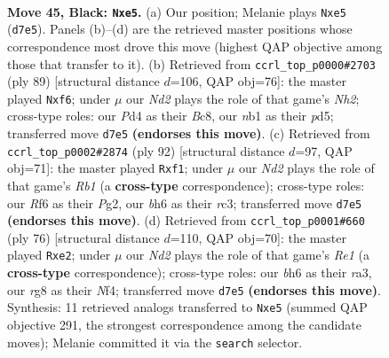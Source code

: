 \documentclass[11pt]{article}
\begin{document}
\clearpage

\begin{figure}[p]\centering
\begin{subfigure}{0.46\textwidth}\centering
\resizebox{\linewidth}{!}{%
\newchessgame
\chessboard[
  setfen={2b3R1/p2nk2p/1P3r1B/4QP2/1p1p4/8/p3P3/1N1K4 b - - 0 45},
  showmover=false,
  pgfstyle=straightmove, color=movearrow, markmove={d7-e5}
]}
\caption{}
\end{subfigure}\hfill
\begin{subfigure}{0.46\textwidth}\centering
\resizebox{\linewidth}{!}{%
\newchessgame
\chessboard[
  setfen={2b2r1k/7n/3p1Q2/3Pn3/p1PN3P/Pp6/1P4R1/4R2K b - - 0 45},
  showmover=false,
  pgfstyle=straightmove, color=movearrow, markmove={h7-f6}
]}
\caption{}
\end{subfigure}
\\[4pt]
\begin{subfigure}{0.46\textwidth}\centering
\resizebox{\linewidth}{!}{%
\newchessgame
\chessboard[
  setfen={8/8/5pk1/3P2Pp/p2NP1b1/P1r5/6P1/1R3q1K w - - 0 47},
  showmover=false,
  pgfstyle=straightmove, color=movearrow, markmove={b1-f1}
]}
\caption{}
\end{subfigure}\hfill
\begin{subfigure}{0.46\textwidth}\centering
\resizebox{\linewidth}{!}{%
\newchessgame
\chessboard[
  setfen={2r3k1/5p1p/3p2p1/1p2b3/4PN1P/rP4B1/4q1K1/3RR3 w - - 0 39},
  showmover=false,
  pgfstyle=straightmove, color=movearrow, markmove={e1-e2}
]}
\caption{}
\end{subfigure}
\caption{\textbf{Move 45, Black: \texttt{Nxe5}.} (a) Our position; Melanie plays \texttt{Nxe5} (\texttt{d7e5}). Panels (b)--(d) are the retrieved master positions whose correspondence most drove this move (highest QAP objective among those that transfer to it). (b) Retrieved from \texttt{ccrl\_top\_p0000\#2703} (ply 89) [structural distance $d$=106, QAP obj=76]: the master played \texttt{Nxf6}; under $\mu$ our \emph{Nd2} plays the role of that game's \emph{Nh2}; cross-type roles: our \emph{P}d4 as their \emph{B}c8, our \emph{n}b1 as their \emph{p}d5; transferred move \texttt{d7e5} \textbf{(endorses this move)}. (c) Retrieved from \texttt{ccrl\_top\_p0002\#2874} (ply 92) [structural distance $d$=97, QAP obj=71]: the master played \texttt{Rxf1}; under $\mu$ our \emph{Nd2} plays the role of that game's \emph{Rb1} (a \textbf{cross-type} correspondence); cross-type roles: our \emph{R}f6 as their \emph{P}g2, our \emph{b}h6 as their \emph{r}c3; transferred move \texttt{d7e5} \textbf{(endorses this move)}. (d) Retrieved from \texttt{ccrl\_top\_p0001\#660} (ply 76) [structural distance $d$=110, QAP obj=70]: the master played \texttt{Rxe2}; under $\mu$ our \emph{Nd2} plays the role of that game's \emph{Re1} (a \textbf{cross-type} correspondence); cross-type roles: our \emph{b}h6 as their \emph{r}a3, our \emph{r}g8 as their \emph{N}f4; transferred move \texttt{d7e5} \textbf{(endorses this move)}. Synthesis: 11 retrieved analogs transferred to \texttt{Nxe5} (summed QAP objective 291, the strongest correspondence among the candidate moves); Melanie committed it via the \texttt{search} selector.}
\label{fig:thought-m89}
\end{figure}
\end{document}
